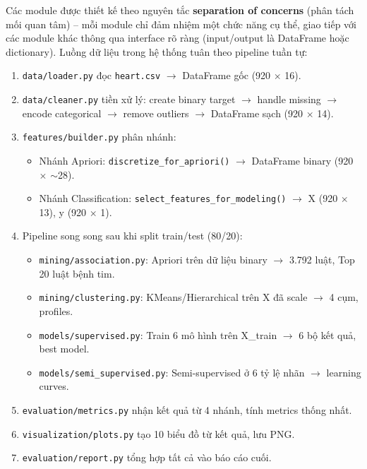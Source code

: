 Các module được thiết kế theo nguyên tắc \textbf{separation of concerns} (phân tách mối quan tâm) -- mỗi module chỉ đảm nhiệm một chức năng cụ thể, giao tiếp với các module khác thông qua interface rõ ràng (input/output là DataFrame hoặc dictionary). Luồng dữ liệu trong hệ thống tuân theo pipeline tuần tự:

\begin{enumerate}
    \item \texttt{data/loader.py} đọc \texttt{heart.csv} $\rightarrow$ DataFrame gốc (920 $\times$ 16).
    \item \texttt{data/cleaner.py} tiền xử lý: create binary target $\rightarrow$ handle missing $\rightarrow$ encode categorical $\rightarrow$ remove outliers $\rightarrow$ DataFrame sạch (920 $\times$ 14).
    \item \texttt{features/builder.py} phân nhánh:
    \begin{itemize}
        \item Nhánh Apriori: \texttt{discretize\_for\_apriori()} $\rightarrow$ DataFrame binary (920 $\times$ $\sim$28).
        \item Nhánh Classification: \texttt{select\_features\_for\_modeling()} $\rightarrow$ X (920 $\times$ 13), y (920 $\times$ 1).
    \end{itemize}
    \item Pipeline song song sau khi split train/test (80/20):
    \begin{itemize}
        \item \texttt{mining/association.py}: Apriori trên dữ liệu binary $\rightarrow$ 3.792 luật, Top 20 luật bệnh tim.
        \item \texttt{mining/clustering.py}: KMeans/Hierarchical trên X đã scale $\rightarrow$ 4 cụm, profiles.
        \item \texttt{models/supervised.py}: Train 6 mô hình trên X\_train $\rightarrow$ 6 bộ kết quả, best model.
        \item \texttt{models/semi\_supervised.py}: Semi-supervised ở 6 tỷ lệ nhãn $\rightarrow$ learning curves.
    \end{itemize}
    \item \texttt{evaluation/metrics.py} nhận kết quả từ 4 nhánh, tính metrics thống nhất.
    \item \texttt{visualization/plots.py} tạo 10 biểu đồ từ kết quả, lưu PNG.
    \item \texttt{evaluation/report.py} tổng hợp tất cả vào báo cáo cuối.
\end{enumerate}

